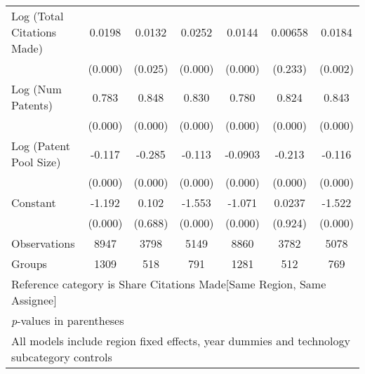 \begin{table}[htbp]
\begin{adjustbox}{angle=90}
\begin{tabular}{l*{6}{c}}
Log (Total Citations Made)&   0.0198&   0.0132&   0.0252&   0.0144&  0.00658&   0.0184\\
                &  (0.000)&  (0.025)&  (0.000)&  (0.000)&  (0.233)&  (0.002)\\
Log (Num Patents)&    0.783&    0.848&    0.830&    0.780&    0.824&    0.843\\
                &  (0.000)&  (0.000)&  (0.000)&  (0.000)&  (0.000)&  (0.000)\\
Log (Patent Pool Size)&   -0.117&   -0.285&   -0.113&  -0.0903&   -0.213&   -0.116\\
                &  (0.000)&  (0.000)&  (0.000)&  (0.000)&  (0.000)&  (0.000)\\
Constant        &   -1.192&    0.102&   -1.553&   -1.071&   0.0237&   -1.522\\
                &  (0.000)&  (0.688)&  (0.000)&  (0.000)&  (0.924)&  (0.000)\\
\hline
Observations    &     8947&     3798&     5149&     8860&     3782&     5078\\
Groups          &     1309&      518&      791&     1281&      512&      769\\
\hline\hline
\multicolumn{7}{l}{\footnotesize Reference category is Share Citations Made[Same Region, Same Assignee]}\\
\multicolumn{7}{l}{\footnotesize \textit{p}-values in parentheses}\\
\multicolumn{7}{l}{\footnotesize All models include region fixed effects, year dummies and technology subcategory controls}\\
\end{tabular}
\end{adjustbox}
\end{table}
